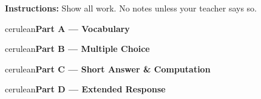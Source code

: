 \documentclass[10pt]{article}
\newcommand{\parthead}[1]{%
  \vspace{6pt}\noindent
  \begin{headlinebox}{cerulean}{\color{white}\bfseries #1}\end{headlinebox}%
  \vspace{4pt}}
\begin{document}
\namedateperiod

\vspace{0.06in}
\noindent\textbf{Instructions:} Show all work. No notes unless your teacher says so.

\parthead{Part A --- Vocabulary}

\parthead{Part B --- Multiple Choice}

\parthead{Part C --- Short Answer \& Computation}

\parthead{Part D --- Extended Response}
\end{document}
